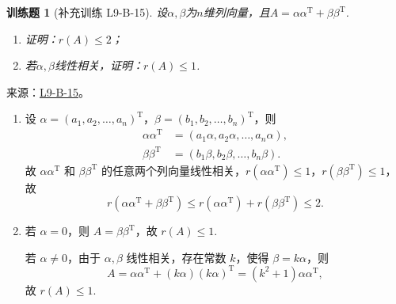 \documentclass[UTF8,12pt,a4paper,fontset=fandol]{ctexart}
\newtheorem{exercise}{训练题}[section]
\begin{document}
\begin{exercise}[补充训练 L9-B-15]\label{prob:L9-B-15}
设$\alpha,\beta$为$n$维列向量，且$A=\alpha\alpha^\mathrm{T}+\beta\beta^\mathrm{T}$.
        \begin{enumerate}
            \item 证明：$r(A) \leqslant 2$；

            \item 若$\alpha,\beta$线性相关，证明：$r(A) \leqslant 1$.
        \end{enumerate}
\end{exercise}
\noindent 来源：\href{https://github.com/yhwu-is/Linear-Algebra-Left-Undone/blob/new/%E8%AE%B2%E4%B9%89/%E4%B8%93%E9%A2%98/9%20%E7%9F%A9%E9%98%B5%E8%BF%90%E7%AE%97%E8%BF%9B%E9%98%B6.tex}{L9-B-15}。
\begin{solve}
\begin{enumerate}
                \item 设 $\alpha = (a_1, a_2, \ldots, a_n)^\mathrm{T}$，$\beta = (b_1, b_2, \ldots, b_n)^\mathrm{T}$，则
                    \begin{align*}
                        \alpha \alpha^\mathrm{T} &= (a_1 \alpha, a_2 \alpha, \ldots, a_n \alpha), \\
                        \beta \beta^\mathrm{T} &= (b_1 \beta, b_2 \beta, \ldots, b_n \beta).
                    \end{align*}
                    故 $\alpha \alpha^\mathrm{T}$ 和 $\beta \beta^\mathrm{T}$ 的任意两个列向量线性相关，$r\left(\alpha \alpha^\mathrm{T}\right) \leqslant 1$，$r\left(\beta \beta^\mathrm{T}\right) \leqslant 1$，故
                    \[
                        r\left(\alpha \alpha^\mathrm{T} + \beta \beta^\mathrm{T}\right) \leqslant r\left(\alpha \alpha^\mathrm{T}\right) + r\left(\beta \beta^\mathrm{T}\right) \leqslant 2.
                    \]

                \item 若 $\alpha = 0$，则 $A = \beta \beta^\mathrm{T}$，故 $r(A) \leqslant 1$.

                    若 $\alpha \neq 0$，由于 $\alpha, \beta$ 线性相关，存在常数 $k$，使得 $\beta = k \alpha$，则
                    \[
                        A = \alpha \alpha^\mathrm{T} + (k \alpha)(k \alpha)^\mathrm{T} = (k^2 + 1) \alpha \alpha^\mathrm{T},
                    \]
                    故 $r(A) \leqslant 1$.
            \end{enumerate}
\end{solve}
\end{document}
